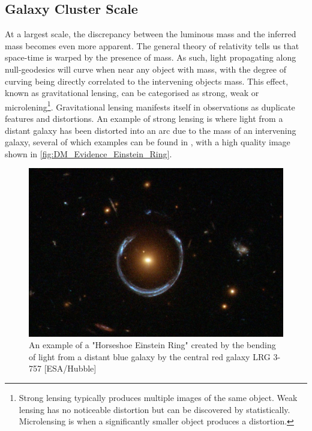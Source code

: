 \subsection{Galaxy Cluster Scale}
\par
At a largest scale, the discrepancy between the luminous mass and the inferred mass becomes even more apparent.
The general theory of relativity tells us that space-time is warped by the presence of mass.
As such, light propagating along null-geodesics will curve when near any object with mass, with the degree of curving being directly correlated to the intervening objects mass.
This effect, known as gravitational lensing, can be categorised as strong, weak or microlening\footnote{Strong lensing typically produces multiple images of the same object. Weak lensing has no noticeable distortion but can be discovered by statistically. Microlensing is when a significantly smaller object produces a distortion.}. 
Gravitational lensing manifests itself in observations as duplicate features and distortions.
An example of strong lensing is where light from a distant galaxy has been distorted into an arc due to the mass of an intervening galaxy, several of which examples can be found in \cite{einstein_ring_discovery_ref}, with a high quality image shown in \autoref{fig:DM_Evidence_Einstein_Ring}.

\begin{figure}[!htbp]%
    \centering
    \includegraphics[scale=0.4]{Figures/DarkMatterEvidence/Einstein_Ring_from_Hubble.JPG}
    \caption{An example of a "Horseshoe Einstein Ring" created by the bending of light from a distant blue galaxy by the central red galaxy LRG 3-757 [ESA/Hubble]}
    \label{fig:DM_Evidence_Einstein_Ring}
\end{figure}

